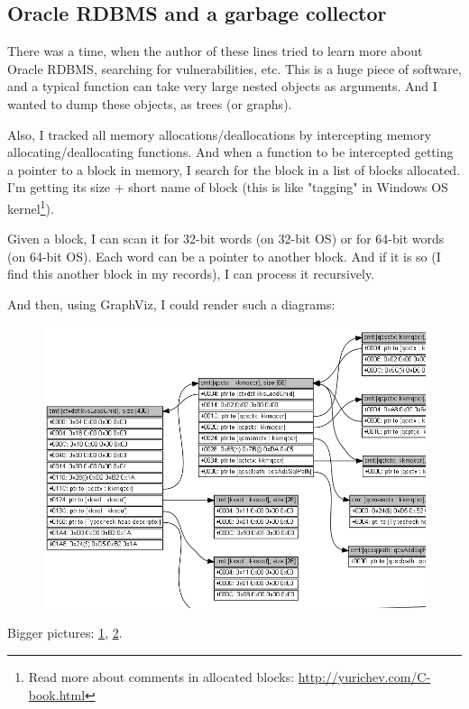 \subsection{Oracle RDBMS and a garbage collector}

There was a time, when the author of these lines tried to learn more about Oracle RDBMS, searching for vulnerabilities, etc.
This is a huge piece of software, and a typical function can take very large nested objects as arguments.
And I wanted to dump these objects, as trees (or graphs).

Also, I tracked all memory allocations/deallocations by intercepting memory allocating/deallocating functions.
And when a function to be intercepted getting a pointer to a block in memory, I search for the block in a list of blocks allocated.
I'm getting its size + short name of block
(this is like "tagging" in Windows OS kernel\footnote{Read more about comments in allocated blocks: \CNotes \url{http://yurichev.com/C-book.html}}).

Given a block, I can scan it for 32-bit words (on 32-bit OS) or for 64-bit words (on 64-bit OS).
Each word can be a pointer to another block.
And if it is so (I find this another block in my records), I can process it recursively.

And then, using GraphViz, I could render such a diagrams:

\begin{figure}[H]
\centering
\includegraphics[scale=0.55]{advanced/450_more_ptrs/oracle2_crop.png}
\end{figure}

Bigger pictures:
\href{https://raw.githubusercontent.com/DennisYurichev/RE-for-beginners/master/advanced/450_more_ptrs/oracle1.png}{1},
\href{https://raw.githubusercontent.com/DennisYurichev/RE-for-beginners/master/advanced/450_more_ptrs/oracle2.png}{2}.

